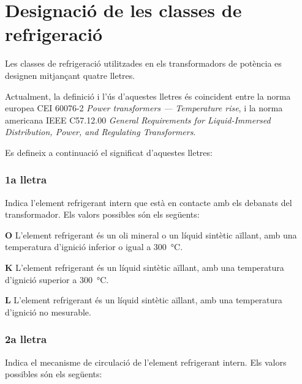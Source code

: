 \section{Designació de les classes de refrigeració}\label{sec:trafos-pot-refrig}
 

Les classes de refrigeració utilitzades en els transformadors de
potència es designen mitjançant quatre lletres.

Actualment, la definició i l'ús d'aquestes lletres és coincident
entre la norma europea CEI 60076-2 \textit{Power transformers --- Temperature rise}, i la norma americana
IEEE C57.12.00  \textit{General Requirements for Liquid-Immersed Distribution, Power, and Regulating Transformers}.

Es defineix a continuació el significat d'aquestes lletres:

\subsubsection*{1a lletra}
Indica l'element refrigerant intern que està en
contacte amb els debanats del transformador. Els valors possibles
són els següents:

\begin{list}{}
   {\setlength{\labelwidth}{10mm} \setlength{\leftmargin}{10mm} \setlength{\labelsep}{2mm}}
   \item[\textbf{O}] L'element refrigerant és un oli mineral o un líquid sintètic aïllant, amb una temperatura d'ignició
   inferior o igual a \qty{300}{\degreeCelsius}.
   \item[\textbf{K}] L'element refrigerant és un líquid sintètic aïllant, amb una temperatura d'ignició
   superior a \qty{300}{\degreeCelsius}.
   \item[\textbf{L}] L'element refrigerant és un líquid sintètic aïllant, amb una temperatura d'ignició
   no mesurable.
\end{list}
  

\subsubsection*{2a lletra}
Indica el mecanisme de circulació de l'element
refrigerant intern. Els valors possibles són els següents:

